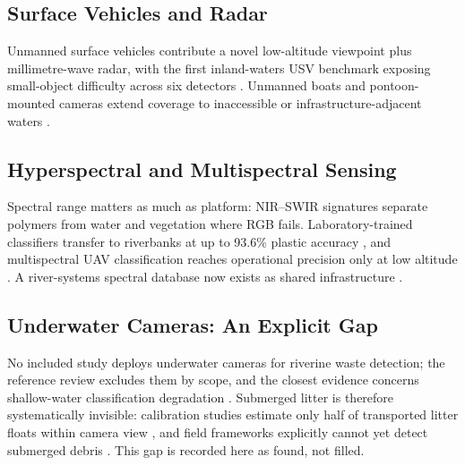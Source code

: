 \documentclass[12pt]{article}
\begin{document}
\subsection{Surface Vehicles and Radar}
Unmanned surface vehicles contribute a novel low-altitude viewpoint plus millimetre-wave radar, with the first inland-waters USV benchmark exposing small-object difficulty across six detectors \cite{Cheng2021}. Unmanned boats and pontoon-mounted cameras extend coverage to inaccessible or infrastructure-adjacent waters \cite{Peng2024,FrontEnv2025}.

\subsection{Hyperspectral and Multispectral Sensing}
Spectral range matters as much as platform: NIR--SWIR signatures separate polymers from water and vegetation where RGB fails. Laboratory-trained classifiers transfer to riverbanks at up to 93.6\% plastic accuracy \cite{Tasseron2022}, and multispectral UAV classification reaches operational precision only at low altitude \cite{Cortesi2022}. A river-systems spectral database now exists as shared infrastructure \cite{Olyaei2024}.

\subsection{Underwater Cameras: An Explicit Gap}
No included study deploys underwater cameras for riverine waste detection; the reference review excludes them by scope, and the closest evidence concerns shallow-water classification degradation \cite{Jakovljevic2020}. Submerged litter is therefore systematically invisible: calibration studies estimate only half of transported litter floats within camera view \cite{Wolf2022}, and field frameworks explicitly cannot yet detect submerged debris \cite{Nunkhaw2025}. This gap is recorded here as found, not filled.
\end{document}
